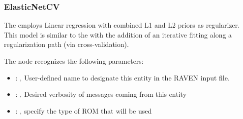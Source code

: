\subsubsection{ElasticNetCV}
  The  employs                         Linear regression with combined L1 and
  L2 priors as regularizer.                         This model is similar to the
                           with the addition of an iterative fitting along a
  regularization path (via cross-validation).

  The  node recognizes the following parameters:
    \begin{itemize}
      \item {}: , 
        User-defined name to designate this entity in the RAVEN input file.
      \item {}: , 
        Desired verbosity of messages coming from this entity
      \item {}: , 
        specify the type of ROM that will be used
  \end{itemize}


